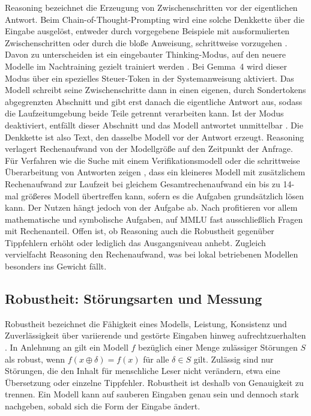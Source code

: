 \documentclass[a4paper,titlepage]{article}
\numberwithin{equation}{section} %
\begin{document}
Reasoning bezeichnet die Erzeugung von Zwischenschritten vor der eigentlichen Antwort. Beim Chain-of-Thought-Prompting wird eine solche Denkkette über die Eingabe ausgelöst, entweder durch vorgegebene Beispiele mit ausformulierten Zwischenschritten \citep{wei_chain--thought_2023} oder durch die bloße Anweisung, schrittweise vorzugehen \citep{kojima_large_2022}. Davon zu unterscheiden ist ein eingebauter Thinking-Modus, auf den neuere Modelle im Nachtraining gezielt trainiert werden \citep{guo_deepseek-r1_2025}. Bei Gemma~4 wird dieser Modus über ein spezielles Steuer-Token in der Systemanweisung aktiviert. Das Modell schreibt seine Zwischenschritte dann in einen eigenen, durch Sondertokens abgegrenzten Abschnitt und gibt erst danach die eigentliche Antwort aus, sodass die Laufzeitumgebung beide Teile getrennt verarbeiten kann. Ist der Modus deaktiviert, entfällt dieser Abschnitt und das Modell antwortet unmittelbar \citep{noauthor_reasoning_nodate}. Die Denkkette ist also Text, den dasselbe Modell vor der Antwort erzeugt. Reasoning verlagert Rechenaufwand von der Modellgröße auf den Zeitpunkt der Anfrage. Für Verfahren wie die Suche mit einem Verifikationsmodell oder die schrittweise Überarbeitung von Antworten zeigen \citet{snell_scaling_2024}, dass ein kleineres Modell mit zusätzlichem Rechenaufwand zur Laufzeit bei gleichem Gesamtrechenaufwand ein bis zu 14-mal größeres Modell übertreffen kann, sofern es die Aufgaben grundsätzlich lösen kann. Der Nutzen hängt jedoch von der Aufgabe ab. Nach \citet{sprague_cot_2025} profitieren vor allem mathematische und symbolische Aufgaben, auf MMLU fast ausschließlich Fragen mit Rechenanteil. Offen ist, ob Reasoning auch die Robustheit gegenüber Tippfehlern erhöht oder lediglich das Ausgangsniveau anhebt. Zugleich vervielfacht Reasoning den Rechenaufwand, was bei lokal betriebenen Modellen besonders ins Gewicht fällt.


\subsection{Robustheit: Störungsarten und Messung}\label{sec:robustheit}

Robustheit bezeichnet die Fähigkeit eines Modells, Leistung, Konsistenz und Zuverlässigkeit über variierende und gestörte Eingaben hinweg aufrechtzuerhalten \citep{zhang_evaluating_2025}. In Anlehnung an \citet{madry_towards_2019} gilt ein Modell $f$ bezüglich einer Menge zulässiger Störungen $S$ als robust, wenn $f(x \oplus \delta) = f(x)$ für alle $\delta \in S$ gilt. Zulässig sind nur Störungen, die den Inhalt für menschliche Leser nicht verändern, etwa eine Übersetzung oder einzelne Tippfehler. Robustheit ist deshalb von Genauigkeit zu trennen. Ein Modell kann auf sauberen Eingaben genau sein und dennoch stark nachgeben, sobald sich die Form der Eingabe ändert.
\end{document}
